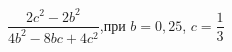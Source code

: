 \begin{ex}[type=expr_calc]
	\begin{condition}
		\( \dfrac{2c^2-2b^2}{4b^2-8bc+4c^2} \),\quad при \( b=0,25 \), \( c=\dfrac{1}{3} \)
	\end{condition}
\end{ex}